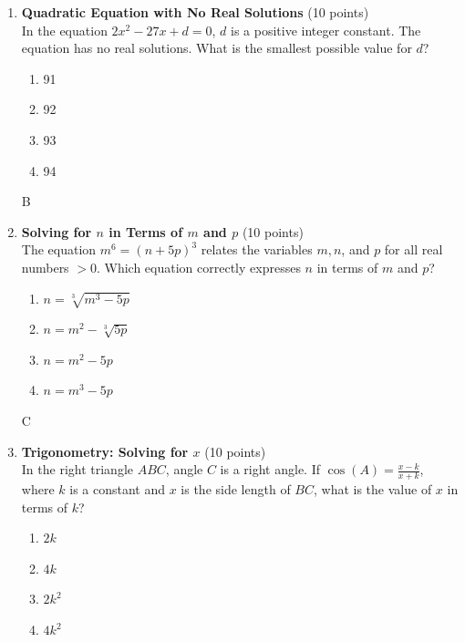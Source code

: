 \begin{enumerate}
  \newpage


  \item \textbf{Quadratic Equation with No Real Solutions} (10 points)\\
  In the equation $2x^2 - 27x + d = 0$, $d$ is a positive integer constant. The equation has no real solutions. What is the smallest possible value for $d$?
  \begin{enumerate}[label=(\Alph*)]
    \item 91
    \item 92
    \item 93
    \item 94
  \end{enumerate}
  \begin{subanswer}
    B
  \end{subanswer}

  \item \textbf{Solving for $n$ in Terms of $m$ and $p$} (10 points)\\
  The equation $m^6 = (n+5p)^3$ relates the variables $m, n$, and $p$ for all real numbers $>0$. Which equation correctly expresses $n$ in terms of $m$ and $p$?
  \begin{enumerate}[label=(\Alph*)]
    \item $n=\sqrt[3]{m^3-5p}$
    \item $n=m^2-\sqrt[3]{5p}$
    \item $n=m^2-5p$
    \item $n=m^3-5p$
  \end{enumerate}
  \begin{subanswer}
    C
  \end{subanswer}

  \item \textbf{Trigonometry: Solving for $x$} (10 points)\\
  In the right triangle $ABC$, angle $C$ is a right angle. If $\cos(A) = \frac{x-k}{x+k}$, where $k$ is a constant and $x$ is the side length of $BC$, what is the value of $x$ in terms of $k$?
  \begin{enumerate}[label=(\Alph*)]
    \item $2k$
    \item $4k$
    \item $2k^2$
    \item $4k^2$
  \end{enumerate}
  \begin{subanswer}
  \end{subanswer}




\end{enumerate}
